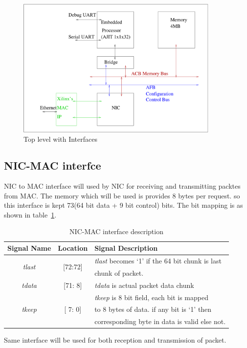 \documentclass[a4paper,11pt, final]{report}
\begin{document}
		\begin{figure}[h]
			\centering
			\includegraphics[width=10cm]{./figures/top_level_for_interfaces.pdf}
			\caption{Top level with Interfaces}
			\label{fig:NIC-Proc-top-level}
		\end{figure}




		\subsection{NIC-MAC interfce}
			NIC to MAC interface will used by NIC for receiving and transmitting packtes from MAC. The memory which will be used is provides 8 bytes per request.
			so this interface is kept 73(64 bit data + 9 bit control) bits. The bit mapping is as shown in table~\ref{tab:NIC-MAC-interface}.
				\begin{table}[!htbp]
					\centering
					\begin{tabular}{ccl}
						\hline
						\textbf{Signal Name} & \textbf{Location} &\textbf{Signal Description}  \\ \hline
						\multirow{2}{*}{\textit{tlast}}	& \multirow{2}{*}{[72:72]}	& \textit{tlast} becomes `1' if the 64 bit chunk is last\\
										& 				& chunk of packet.\\ \hline
						\textit{tdata}   		& [71: 8] 			& \textit{tdata} is actual packet data chunk\\ \hline
						\multirow{3}{*}{\textit{tkeep}}	& \multirow{3}{*}{[ 7: 0]}	& \textit{tkeep} is 8 bit field, each bit is mapped\\
										&				& to 8 bytes of data. if any bit is `1' then\\
										& 				& corresponding byte in data is valid else not.\\ \hline 
					\end{tabular}
					\caption{NIC-MAC interface description}
					\label{tab:NIC-MAC-interface}
				\end{table}
			Same interface will be used for both reception and transmission of packet.
\end{document}
